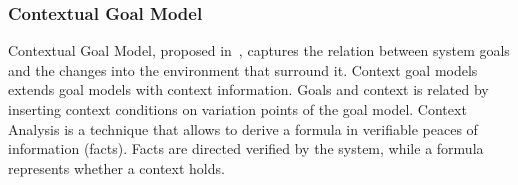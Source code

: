 \subsubsection{Contextual Goal Model}

Contextual Goal Model, proposed in~\cite{ali_goal-based_2010}, captures the relation between system goals and the changes into the environment that surround it. Context goal models extends goal models with context information. Goals and context is related by inserting context conditions on variation points of the goal model. Context Analysis is a technique that allows to derive a formula in verifiable peaces of information (facts). Facts are directed verified by the system, while a formula represents whether a context holds.
